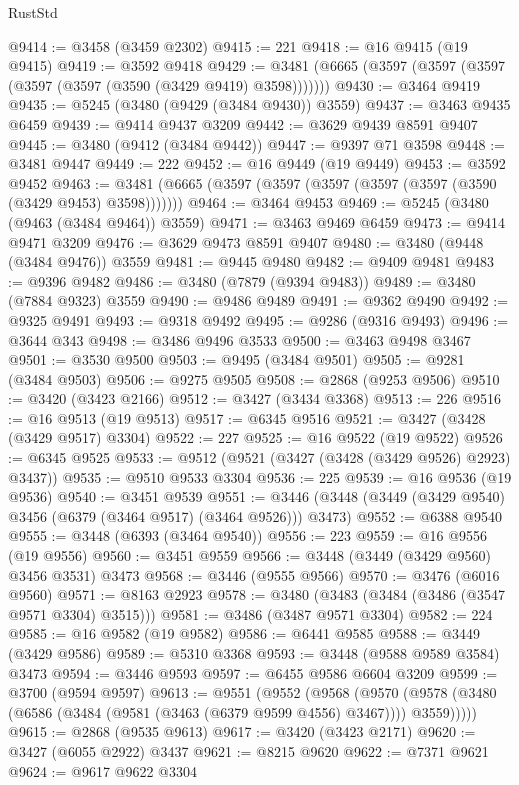 \begin{lexlean}{RustStd}
\begin{coremodule}
{{{{{{{{{{{{{{{{{{{@9414 := @3458 (@3459 @2302)
@9415 := 221
@9418 := @16 @9415 (@19 @9415)
@9419 := @3592 @9418
@9429 := @3481 (@6665 (@3597 (@3597 (@3597 (@3597 (@3597 (@3590 (@3429 @9419) @3598)))))))
@9430 := @3464 @9419
@9435 := @5245 (@3480 (@9429 (@3484 @9430)) @3559)
@9437 := @3463 @9435 @6459
@9439 := @9414 @9437 @3209
@9442 := @3629 @9439 @8591 @9407
@9445 := @3480 (@9412 (@3484 @9442))
@9447 := @9397 @71 @3598
@9448 := @3481 @9447
@9449 := 222
@9452 := @16 @9449 (@19 @9449)
@9453 := @3592 @9452
@9463 := @3481 (@6665 (@3597 (@3597 (@3597 (@3597 (@3597 (@3590 (@3429 @9453) @3598)))))))
@9464 := @3464 @9453
@9469 := @5245 (@3480 (@9463 (@3484 @9464)) @3559)
@9471 := @3463 @9469 @6459
@9473 := @9414 @9471 @3209
@9476 := @3629 @9473 @8591 @9407
@9480 := @3480 (@9448 (@3484 @9476)) @3559
@9481 := @9445 @9480
@9482 := @9409 @9481
@9483 := @9396 @9482
@9486 := @3480 (@7879 (@9394 @9483))
@9489 := @3480 (@7884 @9323) @3559
@9490 := @9486 @9489
@9491 := @9362 @9490
@9492 := @9325 @9491
@9493 := @9318 @9492
@9495 := @9286 (@9316 @9493)
@9496 := @3644 @343
@9498 := @3486 @9496 @3533
@9500 := @3463 @9498 @3467
@9501 := @3530 @9500
@9503 := @9495 (@3484 @9501)
@9505 := @9281 (@3484 @9503)
@9506 := @9275 @9505
@9508 := @2868 (@9253 @9506)
@9510 := @3420 (@3423 @2166)
@9512 := @3427 (@3434 @3368)
@9513 := 226
@9516 := @16 @9513 (@19 @9513)
@9517 := @6345 @9516
@9521 := @3427 (@3428 (@3429 @9517) @3304)
@9522 := 227
@9525 := @16 @9522 (@19 @9522)
@9526 := @6345 @9525
@9533 := @9512 (@9521 (@3427 (@3428 (@3429 @9526) @2923) @3437))
@9535 := @9510 @9533 @3304
@9536 := 225
@9539 := @16 @9536 (@19 @9536)
@9540 := @3451 @9539
@9551 := @3446 (@3448 (@3449 (@3429 @9540) @3456 (@6379 (@3464 @9517) (@3464 @9526))) @3473)
@9552 := @6388 @9540
@9555 := @3448 (@6393 (@3464 @9540))
@9556 := 223
@9559 := @16 @9556 (@19 @9556)
@9560 := @3451 @9559
@9566 := @3448 (@3449 (@3429 @9560) @3456 @3531) @3473
@9568 := @3446 (@9555 @9566)
@9570 := @3476 (@6016 @9560)
@9571 := @8163 @2923
@9578 := @3480 (@3483 (@3484 (@3486 (@3547 @9571 @3304) @3515)))
@9581 := @3486 (@3487 @9571 @3304)
@9582 := 224
@9585 := @16 @9582 (@19 @9582)
@9586 := @6441 @9585
@9588 := @3449 (@3429 @9586)
@9589 := @5310 @3368
@9593 := @3448 (@9588 @9589 @3584) @3473
@9594 := @3446 @9593
@9597 := @6455 @9586 @6604 @3209
@9599 := @3700 (@9594 @9597)
@9613 := @9551
    (@9552
      (@9568
        (@9570 (@9578 (@3480 (@6586 (@3484 (@9581 (@3463 (@6379 @9599 @4556) @3467)))) @3559)))))
@9615 := @2868 (@9535 @9613)
@9617 := @3420 (@3423 @2171)
@9620 := @3427 (@6055 @2922) @3437
@9621 := @8215 @9620
@9622 := @7371 @9621
@9624 := @9617 @9622 @3304
}}}}}}}}}}}}}}}}}}}
\end{coremodule}
\end{lexlean}
